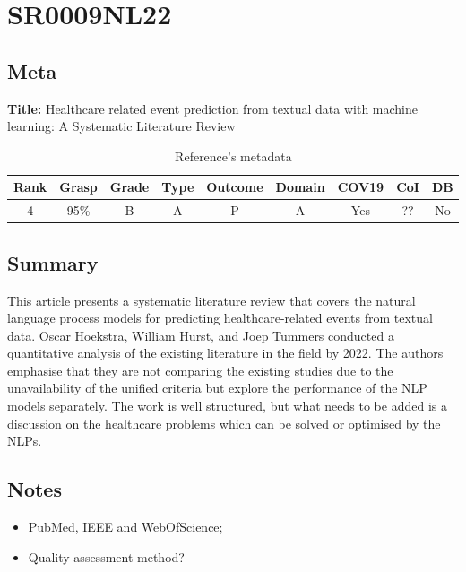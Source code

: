 \section{ SR0009NL22 }


\subsection{Meta}

    \textbf{Title:}
    Healthcare related event prediction from textual data with machine learning: A Systematic Literature Review

    \begin{table}[H]
        \centering
        \begin{tabular}{|c|c|c|c|c|c|c|c|c|}
            \hline
                \textbf{Rank} & \textbf{Grasp} & \textbf{Grade} & \textbf{Type} & \textbf{Outcome} & \textbf{Domain} & \textbf{COV19} & \textbf{CoI} & \textbf{DB} \\
            \hline
                4 & 95\% & B & A & P & A & Yes & ?? & No \\
            \hline
        \end{tabular}
        \caption{Reference's metadata}
        \label{tab:SR0009NL22}
    \end{table}

\subsection{Summary}
This article presents a systematic literature review that covers the natural language process models for predicting healthcare-related events from textual data. Oscar Hoekstra, William Hurst, and Joep Tummers conducted a quantitative analysis of the existing literature in the field by 2022. The authors emphasise that they are not comparing the existing studies due to the unavailability of the unified criteria but explore the performance of the NLP models separately. The work is well structured, but what needs to be added is a discussion on the healthcare problems which can be solved or optimised by the NLPs. 
    

\subsection{Notes}
    \begin{itemize}
        \item PubMed, IEEE and WebOfScience;
        \item Quality assessment method?
    \end{itemize}


